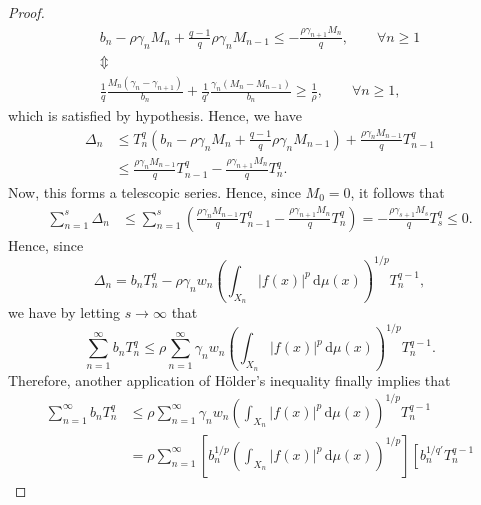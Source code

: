 \documentclass[oneside,10pt]{article}          %
\numberwithin{equation}{section}
\begin{document}
\begin{proof}
    \begin{gather*}
        b_n - \rho\gamma_n M_n
        + \frac{q-1}{q}\rho\gamma_n M_{n-1}
        \leq -\frac{\rho\gamma_{n+1} M_n}{q},
        \qquad \forall n\geq 1 \\
        \Updownarrow \\
        \frac{1}{q}\frac{M_n(\gamma_n-\gamma_{n+1})}{b_n}
    +\frac{1}{q'}\frac{\gamma_n(M_n-M_{n-1})}{b_n}
        \geq
        \frac{1}{\rho},
        \qquad \forall n\geq 1 ,
    \end{gather*}
    which is satisfied by hypothesis. Hence, we have
    \begin{align*}
        \Delta_n &\leq T_n^q \left( b_n - \rho\gamma_n M_n
        + \frac{q-1}{q}\rho\gamma_n M_{n-1} \right)
        + \frac{\rho\gamma_n M_{n-1}}{q} T_{n-1}^q \\
        &\leq \frac{\rho\gamma_n M_{n-1}}{q} T_{n-1}^q
        - \frac{\rho\gamma_{n+1} M_n}{q} T_n^q.
    \end{align*}
    Now, this forms a telescopic series. Hence, since $M_0=0$, it follows that
    \begin{align*}
        \sum_{n=1}^s \Delta_n
        &\leq \sum_{n=1}^s
        \left( \frac{\rho\gamma_n M_{n-1}}{q} T_{n-1}^q
        - \frac{\rho\gamma_{n+1} M_n}{q} T_n^q \right) %
        =
        - \frac{\rho\gamma_{s+1}M_s}{q}T_s^q \leq 0.
    \end{align*}
    Hence, since
    \[
        \Delta_n
        =
        b_nT_n^q
        -
        \rho\gamma_nw_n
        \left(\int_{X_n} |f(x)|^p \,\mathrm{d}\mu(x)\right)^{\!\!1/p}
        T_n^{q-1},
    \]
    we have by letting $s\to\infty$ that
    \[
    \sum_{n=1}^\infty b_n T_n^q
    \leq
    \rho \sum_{n=1}^\infty \gamma_n w_n
    \left( \int_{X_n} |f(x)|^p \,\mathrm{d}\mu(x) \right)^{\!\!1/p}
    T_n^{q-1}.
    \]
    Therefore, another application of Hölder's inequality finally implies that
    \begin{align*}
        \sum_{n=1}^\infty b_n T_n^q
        &\leq \rho \sum_{n=1}^\infty \gamma_nw_n
        \!\left(\int_{X_n} |f(x)|^p \,\mathrm{d}\mu(x) \right)^{\!\!1/p}
        T_n^{q-1} \\
        &=
        \rho \sum_{n=1}^\infty
        \left[
        b_n^{1/p}
        \left(\int_{X_n} |f(x)|^p \,\mathrm{d}\mu(x) \right)^{\!\!1/p}
        \right]
        \left[
        b_n^{1/q'}T_n^{q-1}

\end{align*}
\end{proof}
\end{document}
